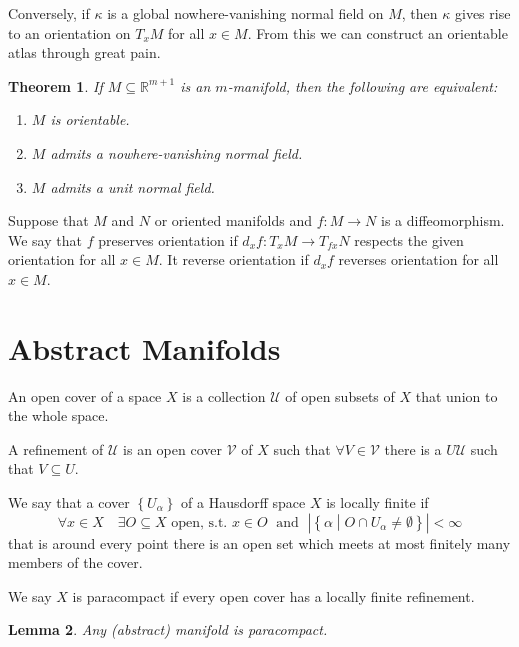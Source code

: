 \documentclass[11pt]{article}
\newcommand{\relmiddle}[1]{\mathrel{}\middle#1\mathrel{}}
\newcommand{\rmv}{\relmiddle|}
\newcommand{\R}{\mathbb{R}}
\newenvironment{defin}
	{\begin{mdframed}[backgroundcolor=white, roundcorner=5pt, linewidth=1pt, linecolor=RoyalBlue]
		\setlength{\parindent}{0pt}}
	{\end{mdframed}}
\newcommand{\mdf}[1]{{\color{RoyalBlue} #1}}
\newtheorem{theorem}{Theorem}[section]
\newtheorem{lemma}[theorem]{Lemma}
\begin{document}
Conversely, if $\kappa$ is a global nowhere-vanishing normal field on $M$, then $\kappa$ gives rise to an orientation on $T_xM$ for all $x\in M$.
From this we can construct an orientable atlas through great pain.

\begin{theorem}
If $M\subseteq\R^{m+1}$ is an $m$-manifold, then the following are equivalent:
\begin{enumerate}[label=(\alph*)]
	\item $M$ is orientable.
	\item $M$ admits a nowhere-vanishing normal field.
	\item $M$ admits a unit normal field.
\end{enumerate}
\end{theorem}

\begin{defin}
Suppose that $M$ and $N$ or oriented manifolds and $f:M\to N$ is a diffeomorphism.
We say that $f$ \mdf{preserves orientation} if $d_xf:T_xM \to T_{fx}N$ respects the given orientation for all $x\in M$.
It \mdf{reverse orientation} if $d_xf$ reverses orientation for all $x\in M$.
\end{defin}

\section{Abstract Manifolds}

\begin{defin}
An \mdf{open cover} of a space $X$ is a collection $\mathcal{U}$ of open subsets of $X$ that union to the whole space.

A \mdf{refinement} of $\mathcal{U}$ is an open cover $\mathcal{V}$ of $X$ such that $\forall V\in \mathcal{V}$ there is a $U\mathcal{U}$ such that $V\subseteq U$.

We say that a cover $\left\{ U_\alpha\right\}$ of a Hausdorff space $X$ is \mdf{locally finite} if
\[
	\forall x \in X \quad \exists O\subseteq X\text{ open, s.t. }x\in O \; \text{ and } \; \left|\left\{ \alpha \rmv O\cap U_\alpha\neq\emptyset\right\}\right|< \infty
\]
that is around every point there is an open set which meets at most finitely many members of the cover.

We say $X$ is \mdf{paracompact} if every open cover has a locally finite refinement.
\end{defin}

\begin{lemma}
Any (abstract) manifold is paracompact.
\end{lemma}
\end{document}

